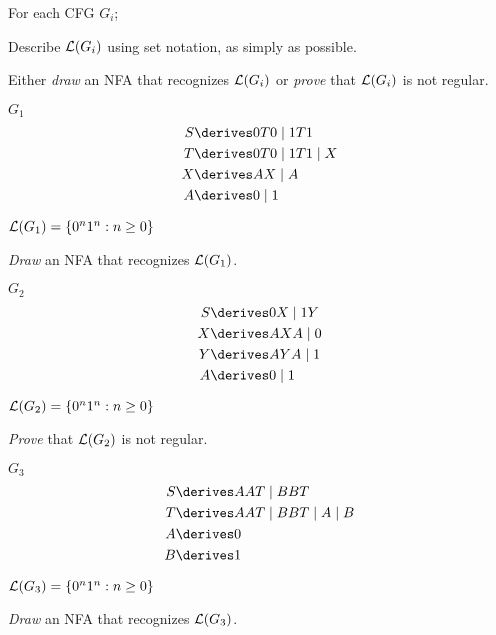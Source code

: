 \begin{problem}
  For each CFG $G_i$;
  \begin{enumroman}
    \item Describe $\mathcal{L}(G_i)$ using set notation, as simply as possible.
    \item Either \emph{draw} an NFA that recognizes $\mathcal{L}(G_i)$ or
      \emph{prove} that $\mathcal{L}(G_i)$ is not regular.
  \end{enumroman}

  \step
  \begin{enumalph}
    \item $G_1$
      \begin{align*}
        S &\derives 0T0 \mid 1T1 \\
        T &\derives 0T0 \mid 1T1 \mid X \\
        X &\derives AX \mid A \\
        A &\derives 0 \mid 1
      \end{align*}
      \begin{Answer}
        \begin{enumroman}
          \item $\mathcal{L}(G_1) = \left\{0^n1^n : n \geq 0\right\}$
          \item \emph{Draw} an NFA that recognizes $\mathcal{L}(G_1)$.
        \end{enumroman}
      \end{Answer}
    \item $G_2$
      \begin{align*}
        S &\derives 0X \mid 1Y \\
        X &\derives AXA \mid 0 \\
        Y &\derives AYA \mid 1 \\
        A &\derives 0 \mid 1
      \end{align*}
      \begin{Answer}
        \begin{enumroman}
          \item $\mathcal{L}(G_2) = \left\{0^n1^n : n \geq 0\right\}$
          \item \emph{Prove} that $\mathcal{L}(G_2)$ is not regular.
        \end{enumroman}
      \end{Answer}

    \item $G_3$
      \begin{align*}
        S &\derives AAT \mid BBT \\
        T &\derives AAT \mid BBT \mid A \mid B \\
        A &\derives 0 \\
        B &\derives 1
      \end{align*}
      \begin{Answer}
        \begin{enumroman}
          \item $\mathcal{L}(G_3) = \left\{0^n1^n : n \geq 0\right\}$
          \item \emph{Draw} an NFA that recognizes $\mathcal{L}(G_3)$.
        \end{enumroman}
      \end{Answer}
  \end{enumalph}
\end{problem}
